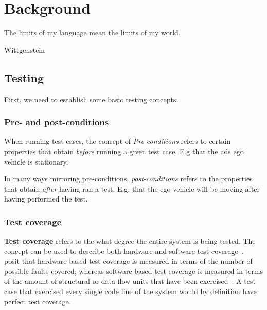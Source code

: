 \chapter{Background}\label{chp:background}

\epigraph{The limits of my language mean the limits of my world.}{Wittgenstein}

\section{Testing}

First, we need to establish some basic testing concepts.

\subsection{Pre- and post-conditions}\label{sec:testingConditions}

When running test cases, the concept of \textit{Pre-conditions}
refers to certain properties that
obtain \textit{before} running a given test case. E.g that the \acrshort{ads} ego vehicle is
stationary.

In many ways mirroring pre-conditions, \textit{post-conditions} refers to the properties that obtain
\textit{after} having ran a test. E.g. that the ego vehicle will be moving after having performed
the test.


\subsection{Test coverage}\label{sec:testCoverage}

\textbf{Test coverage} refers to the what degree the entire system is being tested. The concept can
be used to describe both hardware and software test
coverage~\cite[187]{testCoverage94}.~\citeauthor{testCoverage94} posit that hardware-based test
coverage is measured in terms of the number of possible faults covered, whereas software-based test
coverage is measured in terms of the amount of structural or data-flow units that have been
exercised~\cite[187]{testCoverage94}. A test case that exercised every single code line of the
system would by definition have perfect test coverage.


% 

